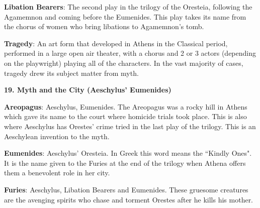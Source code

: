 \documentclass{scrartcl}
\begin{document}
\begin{multicols*}{3}
{\bf Libation Bearers}: The second play in the trilogy of the Oresteia, following the Agamemnon and coming before the Eumenides. This play takes its name from the chorus of women who bring libations to Agamemnon's tomb.

{\bf Tragedy}: An art form that developed in Athens in the Classical period, performed in a large open air theater, with a chorus and 2 or 3 actors (depending on the playwright) playing all of the characters. In the vast majority of cases, tragedy drew its subject matter from myth.


{\bf 19. Myth and the City (Aeschylus' Eumenides)}

{\bf Areopagus}: Aeschylus, Eumenides. The Areopagus was a rocky hill in Athens which gave its name to the court where homicide trials took place. This is also where Aeschylus has Orestes' crime tried in the last play of the trilogy. This is an Aeschylean invention to the myth.

{\bf Eumenides}: Aeschylus' Oresteia. In Greek this word means the ``Kindly Ones". It is the name given to the Furies at the end of the trilogy when Athena offers them a benevolent role in her city.

{\bf Furies}: Aeschylus, Libation Bearers and Eumenides. These gruesome creatures are the avenging spirits who chase and torment Orestes after he kills his mother.


\end{multicols*}
\end{document}
